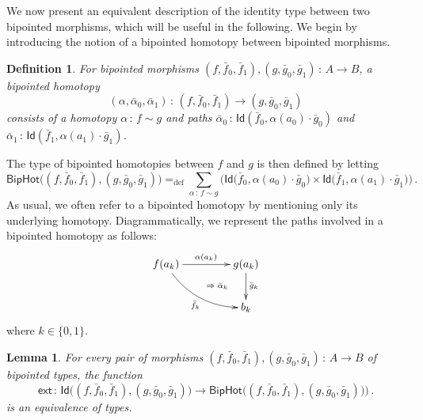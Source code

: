 \documentclass[10pt,a4paper,oneside,reqno]{amsart}
\theoremstyle{mythm}
\newtheorem{lemma}[theorem]{Lemma}
\theoremstyle{mydef}
\newtheorem{definition}[theorem]{Definition}
\theoremstyle{myrmk}
\newcommand{\defeq}{=_{\mathrm{def}}}
\newcommand{\co}{\,{:}\,}
\newcommand{\ct}{\cdot}
\newcommand{\ext}{\mathsf{ext}}
\newcommand{\Id}{\mathsf{Id}}
\newcommand{\BipHot}{\mathsf{BipHot}}
\begin{document}
We now present an equivalent description of the identity type between two bipointed morphisms, which 
will be useful in the following. We begin by introducing the notion of a bipointed homotopy between bipointed morphisms.





\begin{definition} \label{thm:biphomotopy} For bipointed morphisms $(f, \bar{f}_0, \bar{f}_1) , (g, \bar{g}_0, \bar{g}_1) \co A \to B$, 
a \emph{bipointed homotopy} 
\[
(\alpha, \bar{\alpha}_0, \bar{\alpha}_1) \co (f, \bar{f}_0, \bar{f}_1) \to  (g, \bar{g}_0, \bar{g}_1)
\] 
consists of a homotopy $\alpha \co  f \sim g$ and paths
$\bar{\alpha}_0 \co \Id(  \bar{f}_0 , \alpha(a_0)  \cdot \bar{g}_0)$ and $\bar{\alpha}_1 \co \Id(
\bar{f}_1 , \alpha(a_1) \cdot \bar{g}_1)$. 
\end{definition}

The type of bipointed homotopies between $f$ and $g$ is then defined by letting
\[
 \BipHot  \big( (f,\bar{f}_0, \bar{f}_1), (g, \bar{g}_0, \bar{g}_1) \big)   \defeq   
 \sum_{\alpha \co f \sim g}  \big( 
  \Id\big( \bar{f}_0 ,  \alpha(a_0)  \ct \bar{g}_0 \big) \times 
  \Id \big( \bar{f}_1,  \alpha(a_1) \ct  \bar{g}_1 \big) \big) \, .
\]
As usual, we often refer to a bipointed homotopy by mentioning only its underlying homotopy.
Diagrammatically, we represent the paths  involved in a bipointed homotopy as follows:
\[
\xymatrix@C=1.5cm{
f(a_k) \ar[r]^{\alpha(a_k)}  \ar@/_1pc/[dr]_{\bar{f}_k}  
\ar@{}[dr]|{\qquad \Rightarrow \; \bar{\alpha}_k}  & g(a_k) \ar[d]^{\bar{g}_k}  \\ 
 & b_k }
  \] 
where $k \in \{ 0, 1\}$. 


\begin{lemma} \label{BoolHomSpace} 
For every  pair of morphisms $(f, \bar{f}_0, \bar{f}_1), (g, \bar{g}_0, \bar{g}_1) \co A \to B$ of bipointed types, the
function 
\[
\ext \co \Id \big( (f, \bar{f}_0, \bar{f}_1), (g, \bar{g}_0, \bar{g}_1) \big) \to 
\BipHot\big( (f, \bar{f}_0, \bar{f}_1), (g, \bar{g}_0, \bar{g}_1) ) \big) \, .
\]
is an equivalence of types.
\end{lemma}
\end{document}
